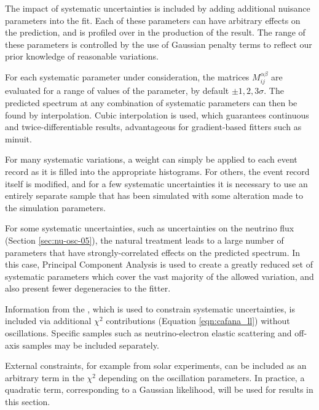 The impact of systematic uncertainties is included by adding additional nuisance parameters into the fit. Each of these parameters can have arbitrary effects on the  prediction, and is profiled over in the production of the result. The range of these parameters is controlled by the use of Gaussian penalty terms to reflect our prior knowledge of reasonable variations.

For each systematic parameter under consideration, the matrices $M_{ij}^{\alpha\beta}$ are evaluated for a range of values of the parameter, by default $\pm1,2,3\sigma$. The predicted spectrum at any combination of systematic parameters can then be found by interpolation. Cubic interpolation is used, which guarantees continuous and twice-differentiable results, advantageous for gradient-based fitters such as {\sc minuit}. %

For many systematic variations, a weight can simply be applied to each event record as it is filled into the appropriate histograms. For others, the event record itself is modified, and for a few systematic uncertainties it is necessary to use an entirely separate sample that has been simulated with some alteration made to the simulation parameters.

For some systematic uncertainties, such as uncertainties on the neutrino flux (Section \ref{sec:nu-osc-05}), the natural treatment leads to a large number of parameters that have strongly-correlated effects on the predicted spectrum. In this case, Principal Component Analysis is used to create a greatly reduced set of systematic parameters which cover the vast majority of the allowed variation, and also present fewer degeneracies to the fitter.

Information from the , which is used to constrain systematic uncertainties, is included via additional $\chi^2$ contributions (Equation \ref{eqn:cafana_ll}) without oscillations. Specific  samples such as neutrino-electron elastic scattering and off-axis samples may be included separately. %

External constraints, for example from solar experiments, can be included as an arbitrary term in the $\chi^2$ depending on the oscillation parameters. In practice, a quadratic term, corresponding to a Gaussian likelihood, will be used for results in this section.

